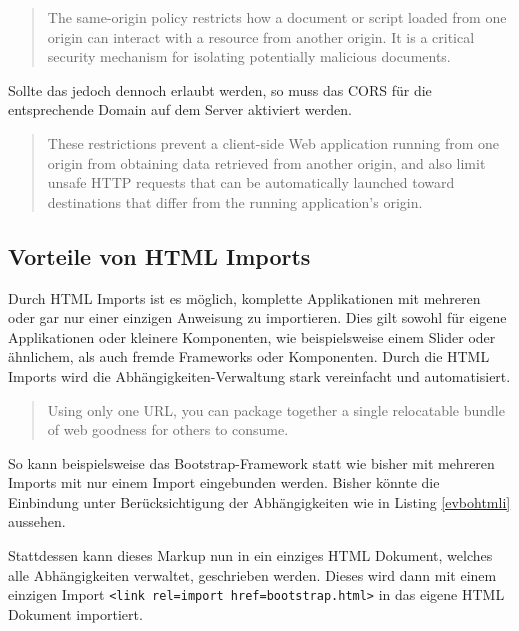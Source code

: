 \begin{quote}
The same-origin policy restricts how a document or script loaded from one origin can interact with a resource from another origin. It is a critical security mechanism for isolating potentially malicious documents. \cite{citeulike:13853253}
\end{quote}

Sollte das jedoch dennoch erlaubt werden, so muss das \ac{CORS} für die entsprechende Domain auf dem Server aktiviert werden.

\begin{quote}
These restrictions prevent a client-side Web application running from one origin from obtaining data retrieved from another origin, and also limit unsafe \ac{HTTP} requests that can be automatically launched toward destinations that differ from the running application's origin. \cite{citeulike:13853643}
\end{quote}


\subsection{Vorteile von HTML Imports}\label{vorteil}

Durch \ac{HTML} Imports ist es möglich, komplette Applikationen mit mehreren oder gar nur einer einzigen Anweisung zu importieren. Dies gilt sowohl für eigene Applikationen oder kleinere Komponenten, wie beispielsweise einem Slider oder ähnlichem, als auch fremde Frameworks oder Komponenten. Durch die \ac{HTML} Imports wird die Abhängigkeiten-Verwaltung stark vereinfacht und automatisiert.

\begin{quote}
Using only one URL, you can package together a single relocatable bundle of web goodness for others to consume. \cite{citeulike:13853647}
\end{quote}

So kann beispielsweise das Bootstrap-Framework statt wie bisher mit mehreren Imports mit nur einem Import eingebunden werden. Bisher könnte die Einbindung unter Berücksichtigung der Abhängigkeiten wie in Listing \ref{evbohtmli} aussehen.



Stattdessen kann dieses Markup nun in ein einziges \ac{HTML} Dokument, welches alle Abhängigkeiten verwaltet, geschrieben werden. Dieses wird dann mit einem einzigen Import \texttt{\textless{}link\ rel=\dq import\dq\ href=\dq bootstrap.html\dq\textgreater{}} in das eigene \ac{HTML} Dokument importiert.


